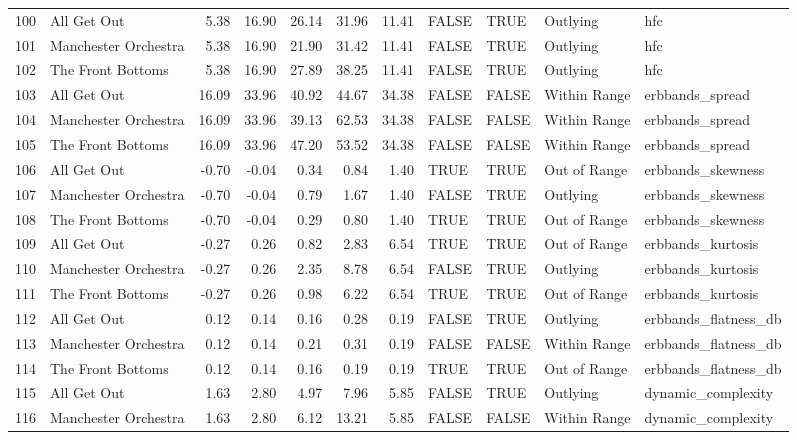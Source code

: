 \begin{table}[ht]
\begin{tabular}{rlrrrrrllll}
  100 & All Get Out & 5.38 & 16.90 & 26.14 & 31.96 & 11.41 & FALSE & TRUE & Outlying & hfc \\ 
  101 & Manchester Orchestra & 5.38 & 16.90 & 21.90 & 31.42 & 11.41 & FALSE & TRUE & Outlying & hfc \\ 
  102 & The Front Bottoms & 5.38 & 16.90 & 27.89 & 38.25 & 11.41 & FALSE & TRUE & Outlying & hfc \\ 
  103 & All Get Out & 16.09 & 33.96 & 40.92 & 44.67 & 34.38 & FALSE & FALSE & Within Range & erbbands\_spread \\ 
  104 & Manchester Orchestra & 16.09 & 33.96 & 39.13 & 62.53 & 34.38 & FALSE & FALSE & Within Range & erbbands\_spread \\ 
  105 & The Front Bottoms & 16.09 & 33.96 & 47.20 & 53.52 & 34.38 & FALSE & FALSE & Within Range & erbbands\_spread \\ 
  106 & All Get Out & -0.70 & -0.04 & 0.34 & 0.84 & 1.40 & TRUE & TRUE & Out of Range & erbbands\_skewness \\ 
  107 & Manchester Orchestra & -0.70 & -0.04 & 0.79 & 1.67 & 1.40 & FALSE & TRUE & Outlying & erbbands\_skewness \\ 
  108 & The Front Bottoms & -0.70 & -0.04 & 0.29 & 0.80 & 1.40 & TRUE & TRUE & Out of Range & erbbands\_skewness \\ 
  109 & All Get Out & -0.27 & 0.26 & 0.82 & 2.83 & 6.54 & TRUE & TRUE & Out of Range & erbbands\_kurtosis \\ 
  110 & Manchester Orchestra & -0.27 & 0.26 & 2.35 & 8.78 & 6.54 & FALSE & TRUE & Outlying & erbbands\_kurtosis \\ 
  111 & The Front Bottoms & -0.27 & 0.26 & 0.98 & 6.22 & 6.54 & TRUE & TRUE & Out of Range & erbbands\_kurtosis \\ 
  112 & All Get Out & 0.12 & 0.14 & 0.16 & 0.28 & 0.19 & FALSE & TRUE & Outlying & erbbands\_flatness\_db \\ 
  113 & Manchester Orchestra & 0.12 & 0.14 & 0.21 & 0.31 & 0.19 & FALSE & FALSE & Within Range & erbbands\_flatness\_db \\ 
  114 & The Front Bottoms & 0.12 & 0.14 & 0.16 & 0.19 & 0.19 & TRUE & TRUE & Out of Range & erbbands\_flatness\_db \\ 
  115 & All Get Out & 1.63 & 2.80 & 4.97 & 7.96 & 5.85 & FALSE & TRUE & Outlying & dynamic\_complexity \\ 
  116 & Manchester Orchestra & 1.63 & 2.80 & 6.12 & 13.21 & 5.85 & FALSE & FALSE & Within Range & dynamic\_complexity \\ 

\end{tabular}
\end{table}
